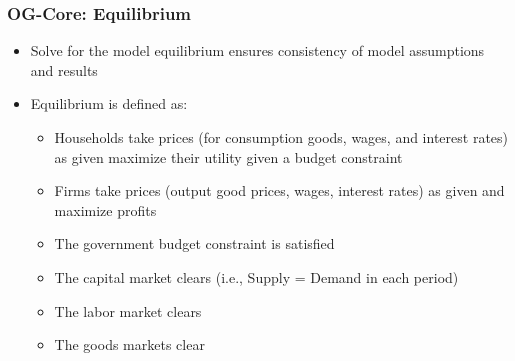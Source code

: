 \documentclass{beamer}
\begin{document}
  \begin{frame}
    \frametitle{OG-Core: Equilibrium}
    \begin{itemize}
      \item Solve for the model equilibrium ensures consistency of model assumptions and results
      \item Equilibrium is defined as:
      \begin{itemize}
        \item Households take prices (for consumption goods, wages, and interest rates) as given maximize their utility given a budget constraint
        \item Firms take prices (output good prices, wages, interest rates) as given and maximize profits
        \item The government budget constraint is satisfied
        \item The capital market clears (i.e., Supply = Demand in each period)
        \item The labor market clears
        \item The goods markets clear
      \end{itemize}
    \end{itemize}
  \end{frame}
\end{document}

